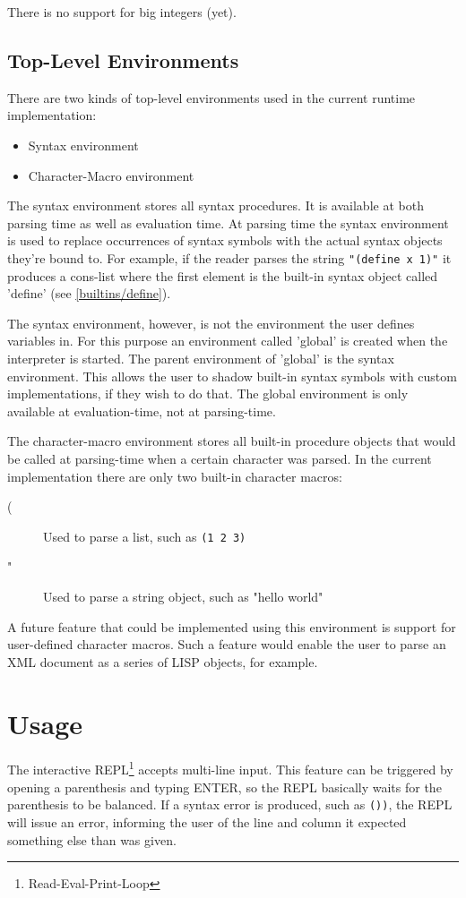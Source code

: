 \documentclass[a4paper]{scrartcl}
\begin{document}
	There is no support for big integers (yet).
	
\subsection{Top-Level Environments}
\label{env}
	There are two kinds of top-level environments used in the current runtime implementation:
	\begin{itemize}
		\item Syntax environment
		\item Character-Macro environment
	\end{itemize}

	The syntax environment stores all syntax procedures. It is available at both parsing time as well as evaluation time. At parsing time the syntax environment is used to replace occurrences of syntax symbols with the actual syntax objects they're bound to. For example, if the reader parses the string \lstinline|"(define x 1)"| it produces a cons-list where the first element is the built-in syntax object called 'define' (see \ref{builtins/define}).

	The syntax environment, however, is not the environment the user defines variables in. For this purpose an environment called 'global' is created when the interpreter is started. The parent environment of 'global' is the syntax environment. This allows the user to shadow built-in syntax symbols with custom implementations, if they wish to do that. The global environment is only available at evaluation-time, not at parsing-time.

	The character-macro environment stores all built-in procedure objects that would be called at parsing-time when a certain character was parsed. In the current implementation there are only two built-in character macros:
	\begin{description}
		\item[(] Used to parse a list, such as \lstinline|(1 2 3)|
		\item["] Used to parse a string object, such as "hello world"
	\end{description}

	A future feature that could be implemented using this environment is support for user-defined character macros. Such a feature would enable the user to parse an XML document as a series of LISP objects, for example.

\section{Usage}
\label{usage}
	The interactive REPL\footnote{Read-Eval-Print-Loop} accepts multi-line input. This feature can be triggered by opening a parenthesis and typing ENTER, so the REPL basically waits for the parenthesis to be balanced. If a syntax error is produced, such as \lstinline|())|, the REPL will issue an error, informing the user of the line and column it expected something else than was given.
\end{document}
